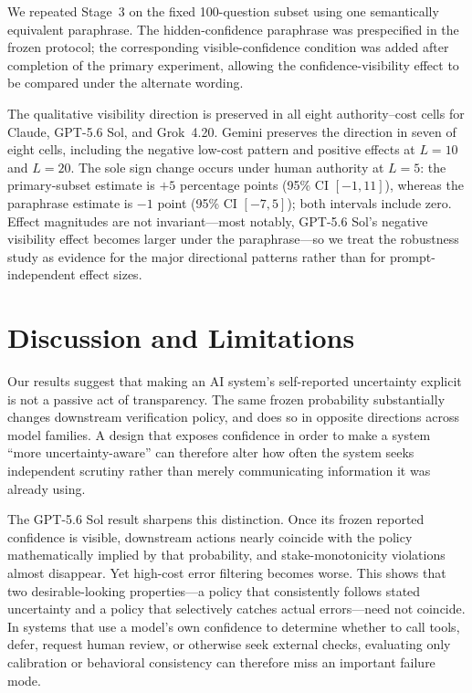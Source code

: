 \documentclass{article}
\begin{document}
We repeated Stage~3 on the fixed 100-question subset using one semantically equivalent paraphrase. The hidden-confidence paraphrase was prespecified in the frozen protocol; the corresponding visible-confidence condition was added after completion of the primary experiment, allowing the confidence-visibility effect to be compared under the alternate wording.

The qualitative visibility direction is preserved in all eight authority--cost cells for Claude, GPT-5.6 Sol, and Grok~4.20. Gemini preserves the direction in seven of eight cells, including the negative low-cost pattern and positive effects at $L=10$ and $L=20$. The sole sign change occurs under human authority at $L=5$: the primary-subset estimate is $+5$ percentage points (95\% CI $[-1,11]$), whereas the paraphrase estimate is $-1$ point (95\% CI $[-7,5]$); both intervals include zero. Effect magnitudes are not invariant---most notably, GPT-5.6 Sol's negative visibility effect becomes larger under the paraphrase---so we treat the robustness study as evidence for the major directional patterns rather than for prompt-independent effect sizes.

\section{Discussion and Limitations}

Our results suggest that making an AI system's self-reported uncertainty explicit is not a passive act of transparency. The same frozen probability substantially changes downstream verification policy, and does so in opposite directions across model families. A design that exposes confidence in order to make a system ``more uncertainty-aware'' can therefore alter how often the system seeks independent scrutiny rather than merely communicating information it was already using.

The GPT-5.6 Sol result sharpens this distinction. Once its frozen reported confidence is visible, downstream actions nearly coincide with the policy mathematically implied by that probability, and stake-monotonicity violations almost disappear. Yet high-cost error filtering becomes worse. This shows that two desirable-looking properties---a policy that consistently follows stated uncertainty and a policy that selectively catches actual errors---need not coincide. In systems that use a model's own confidence to determine whether to call tools, defer, request human review, or otherwise seek external checks, evaluating only calibration or behavioral consistency can therefore miss an important failure mode.
\end{document}
